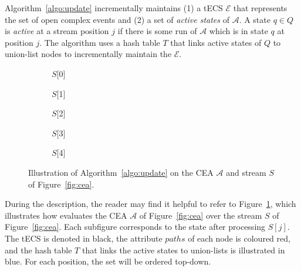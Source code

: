 Algorithm~\ref{algo:update} incrementally maintains (1) a tECS $\mathcal{E}$ that represents the set of open complex events and (2) a set of \emph{active states} of $\mathcal{A}$. A state $q \in Q$ is \emph{active} at a stream position $j$ if there is some run of $\mathcal{A}$ which is in state $q$ at position $j$. The algorithm uses a hash table $T$ that links active states of $Q$ to union-list nodes to incrementally maintain the $\mathcal{E}$.

\begin{figure}[H]
  \centering
  \begin{subfigure}[b]{0.1\linewidth}
    \caption*{$S[$0$]$}
  \end{subfigure}
  \begin{subfigure}[b]{0.1\linewidth}
    \caption*{$S[$1$]$}
  \end{subfigure}
  \begin{subfigure}[b]{0.24\linewidth}
    \caption*{$S[$2$]$}
  \end{subfigure}
  \begin{subfigure}[b]{0.24\linewidth}
    \caption*{$S[$3$]$}
  \end{subfigure}
  \begin{subfigure}[b]{0.28\linewidth}
    \caption*{$S[$4$]$}
  \end{subfigure}
  \caption{Illustration of Algorithm~\ref{algo:update} on the CEA $\mathcal{A}$ and stream $S$ of Figure~\ref{fig:cea}.}
  \label{fig:tecs:update}
\end{figure}

During the description, the reader may find it helpful to refer to Figure~\ref{fig:tecs:update}, which illustrates how  evaluates the CEA $\mathcal{A}$ of Figure~\ref{fig:cea} over the stream $S$ of Figure~\ref{fig:cea}. Each subfigure corresponds to the state after processing $S[j]$. The tECS is denoted in black, the attribute $paths$ of each node is coloured red, and the hash table $T$ that links the active states to union-lists is illustrated in blue. For each position, the set  will be ordered top-down.

